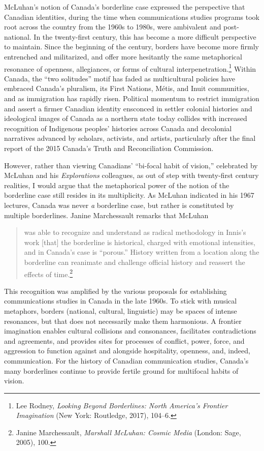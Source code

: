 \documentclass{tufte-handout}
\begin{document}
McLuhan's notion of Canada's borderline case expressed the perspective
that Canadian identities, during the time when communications studies
programs took root across the country from the 1960s to 1980s, were
ambivalent and post-national. In the twenty-first century, this has
become a more difficult perspective to maintain. Since the beginning of
the century, borders have become more firmly entrenched and militarized,
and offer more hesitantly the same metaphorical resonance of openness,
allegiances, or forms of cultural interpenetration.\footnote{Lee Rodney,
  \emph{Looking Beyond Borderlines: North America's Frontier
  Imagination} (New York: Routledge, 2017), 104--6.} Within Canada, the
``two solitudes'' motif has faded as multicultural policies have
embraced Canada's pluralism, its First Nations, Métis, and Inuit
communities, and as immigration has rapidly risen. Political momentum to
restrict immigration and assert a firmer Canadian identity ensconced in
settler colonial histories and ideological images of Canada as a
northern state today collides with increased recognition of Indigenous
peoples' histories across Canada and decolonial narratives advanced by
scholars, activists, and artists, particularly after the final report of
the 2015 Canada's Truth and Reconciliation Commission.

However, rather than viewing Canadians' ``bi-focal habit of vision,''
celebrated by McLuhan and his \emph{Explorations} colleagues, as out of
step with twenty-first century realities, I would argue that the
metaphorical power of the notion of the borderline case still resides in
its multiplicity. As McLuhan indicated in his 1967 lectures, Canada was
never \emph{a} borderline case, but rather is constituted by multiple
borderlines. Janine Marchessault remarks that McLuhan

\begin{quote}
was able to recognize and understand as radical methodology in Innis's
work {[}that{]} the borderline is historical, charged with emotional
intensities, and in Canada's case is ``porous.'' History written from a
location along the borderline can reanimate and challenge official
history and reassert the effects of time.\footnote{Janine Marchessault,
  \emph{Marshall McLuhan: Cosmic Media} (London: Sage, 2005), 100.}
\end{quote}

\noindent This recognition was amplified by the various proposals for establishing
communications studies in Canada in the late 1960s. To stick with
musical metaphors, borders (national, cultural, linguistic) may be
spaces of intense resonances, but that does not necessarily make them
harmonious. A frontier imagination enables cultural collisions and
consonances, facilitates contradictions and agreements, and provides
sites for processes of conflict, power, force, and aggression to
function against and alongside hospitality, openness, and, indeed,
communication. For the history of Canadian communication studies,
Canada's many borderlines continue to provide fertile ground for
multifocal habits of vision.
\end{document}
